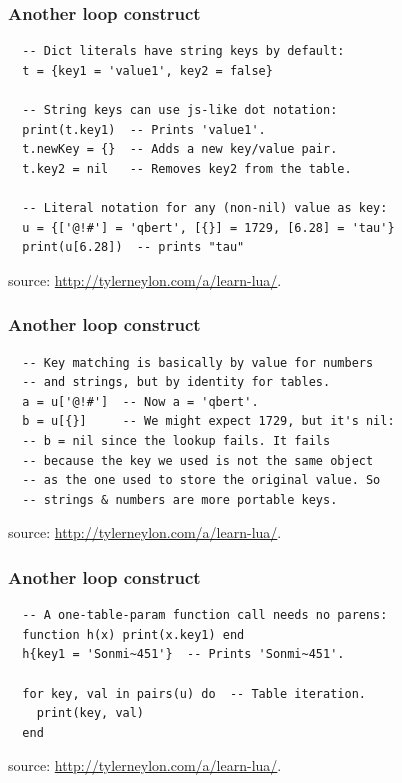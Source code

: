 \begin{frame}[fragile]
  \frametitle{Another loop construct}
  \begin{verbatim}
  -- Dict literals have string keys by default:
  t = {key1 = 'value1', key2 = false}

  -- String keys can use js-like dot notation:
  print(t.key1)  -- Prints 'value1'.
  t.newKey = {}  -- Adds a new key/value pair.
  t.key2 = nil   -- Removes key2 from the table.

  -- Literal notation for any (non-nil) value as key:
  u = {['@!#'] = 'qbert', [{}] = 1729, [6.28] = 'tau'}
  print(u[6.28])  -- prints "tau"
  \end{verbatim}
  \vfill
  \begin{center}
    \begin{tiny}
      source: \url{http://tylerneylon.com/a/learn-lua/}.
    \end{tiny}
  \end{center}
\end{frame}


\begin{frame}[fragile]
  \frametitle{Another loop construct}
  \begin{verbatim}
  -- Key matching is basically by value for numbers
  -- and strings, but by identity for tables.
  a = u['@!#']  -- Now a = 'qbert'.
  b = u[{}]     -- We might expect 1729, but it's nil:
  -- b = nil since the lookup fails. It fails
  -- because the key we used is not the same object
  -- as the one used to store the original value. So
  -- strings & numbers are more portable keys.
  \end{verbatim}
  \vfill
  \begin{center}
    \begin{tiny}
      source: \url{http://tylerneylon.com/a/learn-lua/}.
    \end{tiny}
  \end{center}
\end{frame}

\begin{frame}[fragile]
  \frametitle{Another loop construct}
  \begin{verbatim}
  -- A one-table-param function call needs no parens:
  function h(x) print(x.key1) end
  h{key1 = 'Sonmi~451'}  -- Prints 'Sonmi~451'.

  for key, val in pairs(u) do  -- Table iteration.
    print(key, val)
  end
  \end{verbatim}
  \vfill
  \begin{center}
    \begin{tiny}
      source: \url{http://tylerneylon.com/a/learn-lua/}.
    \end{tiny}
  \end{center}
\end{frame}



